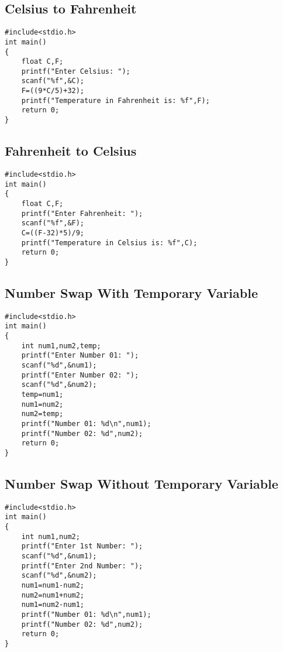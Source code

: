 \documentclass[a4paper,14pt]{article}
\begin{document}
\subsection{Celsius to Fahrenheit}
\vspace{0.5cm}
\begin{lstlisting}[caption={Celsius to Fahrenheit}]
#include<stdio.h>
int main()
{
    float C,F;
    printf("Enter Celsius: ");
    scanf("%f",&C);
    F=((9*C/5)+32);
    printf("Temperature in Fahrenheit is: %f",F);
    return 0;
}
\end{lstlisting}
\newpage

\subsection{Fahrenheit to Celsius}
\vspace{0.5cm}
\begin{lstlisting}[caption={Fahrenheit to Celsius}]
#include<stdio.h>
int main()
{
    float C,F;
    printf("Enter Fahrenheit: ");
    scanf("%f",&F);
    C=((F-32)*5)/9;
    printf("Temperature in Celsius is: %f",C);
    return 0;
}
\end{lstlisting}
\newpage

\subsection{Number Swap With Temporary Variable}
\vspace{0.5cm}
\begin{lstlisting}[caption={Number Swap With Temporary Variable}]
#include<stdio.h>
int main()
{
    int num1,num2,temp;
    printf("Enter Number 01: ");
    scanf("%d",&num1);
    printf("Enter Number 02: ");
    scanf("%d",&num2);
    temp=num1;
    num1=num2;
    num2=temp;
    printf("Number 01: %d\n",num1);
    printf("Number 02: %d",num2);
    return 0;
}
\end{lstlisting}
\newpage

\subsection{Number Swap Without Temporary Variable}
\vspace{0.5cm}
\begin{lstlisting}[caption={Number Swap Without Temporary Variable}]
#include<stdio.h>
int main()
{
    int num1,num2;
    printf("Enter 1st Number: ");
    scanf("%d",&num1);
    printf("Enter 2nd Number: ");
    scanf("%d",&num2);
    num1=num1-num2;
    num2=num1+num2;
    num1=num2-num1;
    printf("Number 01: %d\n",num1);
    printf("Number 02: %d",num2);
    return 0;
}
\end{lstlisting}
\newpage
\end{document}
